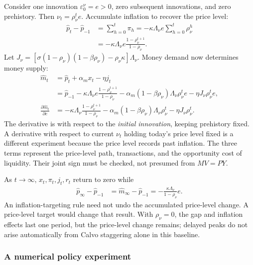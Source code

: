 Consider one innovation $\varepsilon_0^\nu=e>0$, zero subsequent innovations,
and zero prehistory. Then $\nu_t=\rho_\nu^t e$. Accumulate inflation to recover
the price level:
\begin{align}
 \hat p_t-\hat p_{-1}
 &=\sum_{h=0}^t\pi_h
 =-\kappa\Lambda_\nu e\sum_{h=0}^t\rho_\nu^h\\
 &=-\kappa\Lambda_\nu e\frac{1-\rho_\nu^{t+1}}{1-\rho_\nu}.
\end{align}
Let $J_\nu=[\sigma(1-\rho_\nu)(1-\beta\rho_\nu)
-\rho_\nu\kappa]\Lambda_\nu$. Money demand now determines money supply:
\begin{align}
 \hat m_t&=\hat p_t+\alpha_mx_t-\eta j_t\\
 &=\hat p_{-1}-\kappa\Lambda_\nu e
                \frac{1-\rho_\nu^{t+1}}{1-\rho_\nu}
       -\alpha_m(1-\beta\rho_\nu)\Lambda_\nu\rho_\nu^te
       -\eta J_\nu\rho_\nu^te,\\
 \frac{\partial\hat m_t}{\partial e}
 &=-\kappa\Lambda_\nu\frac{1-\rho_\nu^{t+1}}{1-\rho_\nu}
       -\alpha_m(1-\beta\rho_\nu)\Lambda_\nu\rho_\nu^t
       -\eta J_\nu\rho_\nu^t.\label{eq:nk-money-response}
\end{align}
The derivative is with respect to the \emph{initial innovation}, keeping
prehistory fixed. A derivative with respect to current $\nu_t$ holding today's
price level fixed is a different experiment because the price level records
past inflation. The three terms represent the price-level path, transactions,
and the opportunity cost of liquidity. Their joint sign must be checked, not
presumed from $MV=PY$.

As $t\to\infty$, $x_t,\pi_t,j_t,r_t$ return to zero while
\begin{align}
 \hat p_\infty-\hat p_{-1}
 &=\hat m_\infty-\hat p_{-1}
 =-\frac{\kappa\Lambda_\nu}{1-\rho_\nu}e.
\end{align}
An inflation-targeting rule need not undo the accumulated price-level change.
A price-level target would change that result. With $\rho_\nu=0$, the gap and
inflation effects last one period, but the price-level change remains; delayed
peaks do not arise automatically from Calvo staggering alone in this baseline.

\subsubsection{A numerical policy experiment}

